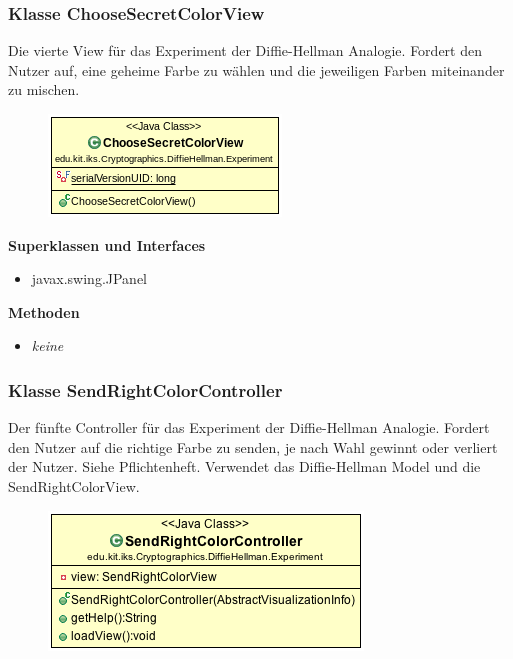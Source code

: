 \documentclass{article}
\begin{document}
\subsubsection{Klasse ChooseSecretColorView}
      Die vierte View für das Experiment der Diffie-Hellman Analogie.
      Fordert den Nutzer auf, eine geheime Farbe zu wählen und die
      jeweiligen Farben miteinander zu mischen.

      \begin{figure}[H]
        \centering
        \includegraphics{resources/edu-kit-iks-Cryptographics-DiffieHellman-Experiment-ChooseSecretColorView}
      \end{figure}

      \textbf{Superklassen und Interfaces}
      \begin{itemize}
        \item javax.swing.JPanel
      \end{itemize}

      \textbf{Methoden}
      \begin{itemize}
        \item \textit{keine}
      \end{itemize}

\subsubsection{Klasse SendRightColorController}
      Der fünfte Controller für das Experiment der Diffie-Hellman Analogie.
      Fordert den Nutzer auf die richtige Farbe zu senden,
      je nach Wahl gewinnt oder verliert der Nutzer. Siehe Pflichtenheft.
      Verwendet das Diffie-Hellman Model und die SendRightColorView.

      \begin{figure}[H]
        \centering
        \includegraphics{resources/edu-kit-iks-Cryptographics-DiffieHellman-Experiment-SendRightColorController}
      \end{figure}
\end{document}
